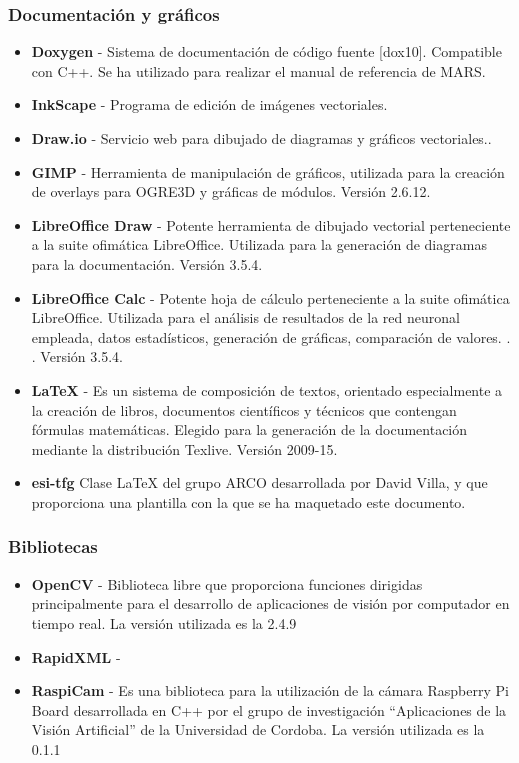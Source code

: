 \subsubsection{Documentación y gráficos}
\begin{itemize}
\item \textbf{Doxygen} - Sistema de documentación de código fuente [dox10]. Compatible con C++. Se ha utilizado para realizar el manual de referencia de MARS.
\item \textbf{InkScape} - Programa de edición de imágenes vectoriales.
\item \textbf{Draw.io} - Servicio web para dibujado de diagramas y gráficos vectoriales..
\item \textbf{GIMP} - Herramienta de manipulación de gráficos, utilizada para la creación de overlays para OGRE3D y gráficas de módulos. Versión 2.6.12.
\item \textbf{LibreOffice Draw} - Potente herramienta de dibujado vectorial perteneciente a la suite ofimática LibreOffice. Utilizada para la generación de diagramas para la documentación. Versión 3.5.4.
\item \textbf{LibreOffice Calc} - Potente hoja de cálculo perteneciente a la suite ofimática LibreOffice. Utilizada para el análisis de resultados de la red neuronal empleada, datos estadísticos, generación de gráficas, comparación de valores. . . Versión 3.5.4.
\item \textbf{\LaTeX{}} - Es un sistema de composición de textos, orientado especialmente a la creación de libros, documentos científicos y técnicos que contengan fórmulas matemáticas. Elegido para la generación de la documentación mediante la distribución Texlive. Versión 2009-15.
\item  \textbf{esi-tfg} Clase \LaTeX{} del grupo \acs{ARCO} desarrollada por David Villa, y que proporciona una plantilla con la que se ha maquetado este documento.
\end{itemize}


\subsubsection{Bibliotecas}
\begin{itemize}
\item \textbf{OpenCV} - Biblioteca libre que proporciona funciones dirigidas principalmente para el desarrollo de aplicaciones de visión por computador en tiempo real. La versión utilizada es la 2.4.9
\item \textbf{RapidXML} - 
\item \textbf{RaspiCam} -  Es una biblioteca para la utilización de la cámara Raspberry Pi Board desarrollada en C++ por el grupo de investigación ``Aplicaciones de la Visión Artificial'' de la Universidad de Cordoba. La versión utilizada es la 0.1.1 
\end{itemize}

